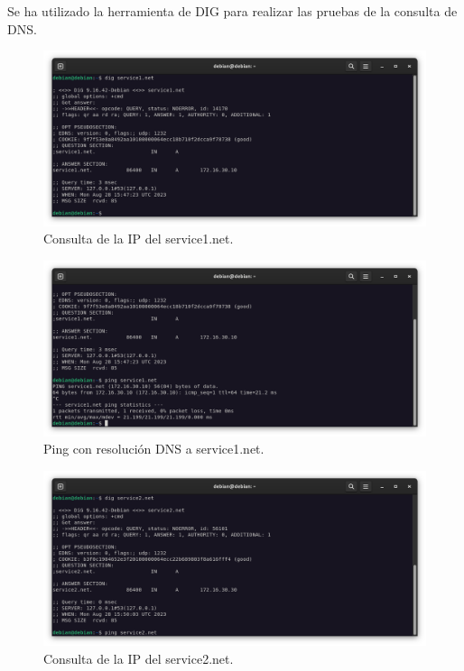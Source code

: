 Se ha utilizado la herramienta de DIG para realizar las pruebas de la consulta de DNS.

\begin{figure}[H]
	\centering
	\includegraphics[scale=0.30]{09}
	\caption{Consulta de la IP del service1.net.}
\end{figure}

\begin{figure}[H]
	\centering
	\includegraphics[scale=0.30]{10}
	\caption{Ping con resolución DNS a service1.net.}
\end{figure}

\begin{figure}[H]
	\centering
	\includegraphics[scale=0.30]{11}
	\caption{Consulta de la IP del service2.net.}
\end{figure}

